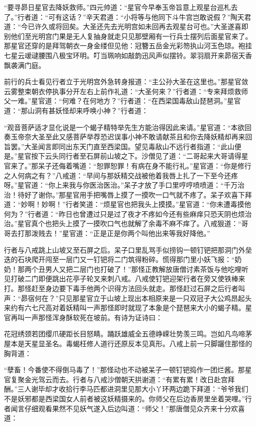 \documentclass[12pt,UTF8]{ctexbook}
\begin{document}
“要寻昴日星官去降妖救师。”四元帅道：“星官今早奉玉帝旨意上观星台巡札去了。”行者道：“可有这话？”辛天君道：“小将等与他同下斗牛宫岂敢说假？”陶天君道：“今已许久或将回矣。大圣还先去光明宫如未回再去观星台可也。”大圣遂喜即别他们至光明宫门果是无人复抽身就走只见那壁厢有一行兵士摆列后面星官来了。那星官还穿的是拜驾朝衣一身金缕但见他：冠簪五岳金光彩笏执山河玉色琼。袍挂七星云叆叇腰围八极宝环明。叮当珮响如敲韵迅风声似摆铃。翠羽扇开来昴宿天香飘袭满门庭。

前行的兵士看见行者立于光明宫外急转身报道：“主公孙大圣在这里也。”那星官敛云雾整束朝衣停执事分开左右上前作礼道：“大圣何来？”行者道：“专来拜烦救师父一难。”星官道：“何难？在何地方？”行者道：“在西梁国毒敌山琵琶洞。”星官道：“那山洞有甚妖怪却来呼唤小神？”行者道：

“观音菩萨适才显化说是一个蝎子精特举先生方能治得因此来请。”星官道：“本欲回奏玉帝奈大圣至此又感菩萨举荐恐迟误事小神不敢请献茶且和你去降妖精却再来回旨罢。”大圣闻言即同出东天门直至西梁国。望见毒敌山不远行者指道：“此山便是。”星官按下云头同行者至石屏前山坡之下。沙僧见了道：“二哥起来大哥请得星官来了。”那呆子还侮着嘴道：“恕罪恕罪！有病在身不能行礼。”星官道：“你是修行之人何病之有？”八戒道：“早间与那妖精交战被他着我唇上扎了一下至今还疼呀。”星官道：“你上来我与你医治医治。”呆子才放了手口里哼哼喷喷道：“千万治治！待好了谢你。”那星官用手把嘴唇上摸了一摸吹一口气就不疼了。呆子欢喜下拜道：“妙啊！妙啊！”行者笑道：“烦星官也把我头上摸摸。”星官道：“你未遭毒摸他何为？”行者道：“昨日也曾遭过只是过了夜才不疼如今还有些麻痒只恐天阴也烦治治。”星官真个也把头上摸了一摸吹口气也就解了余毒不麻不痒了。八戒狠道：“哥哥去打那泼贱去！”星官道：“正是正是你两个叫他出来等我好降他。”

行者与八戒跳上山坡又至石屏之后。呆子口里乱骂手似捞钩一顿钉钯把那洞门外垒迭的石块爬开闯至一层门又一钉钯将二门筑得粉碎。慌得那门里小妖飞报：“奶奶！那两个丑男人又把二层门也打破了！”那怪正教解放唐僧讨素茶饭与他吃哩听见打破二门即便跳出花亭子轮叉来刺八戒。八戒使钉钯迎架行者在旁又使铁棒来打。那怪赶至身边要下毒手他两个识得方法回头就走。那怪赶过石屏之后行者叫声：“昴宿何在？”只见那星官立于山坡上现出本相原来是一只双冠子大公鸡昂起头来约有六七尺高对着妖精叫一声那怪即时就现了本象是个琵琶来大小的蝎子精。星官再叫一声那怪浑身酥软死在坡前。有诗为证诗曰：

花冠绣颈若团缨爪硬距长目怒睛。踊跃雄威全五德峥嵘壮势羡三鸣。岂如凡鸟啼茅屋本是天星显圣名。毒蝎枉修人道行还原反本见真形。八戒上前一只脚躧住那怪的胸背道：

“孽畜！今番使不得倒马毒了！”那怪动也不动被呆子一顿钉钯捣作一团烂酱。那星官复聚金光驾云而去。行者与八戒沙僧朝天拱谢道：“有累有累！改日赴宫拜酬。”三人谢毕却才收拾行李马匹都进洞里见那大小丫环两边跪下拜道：“爷爷我们不是妖邪都是西梁国女人前者被这妖精摄来的。你师父在后边香房里坐着哭哩。”行者闻言仔细观看果然不见妖气遂入后边叫道：“师父！”那唐僧见众齐来十分欢喜道：
\end{document}
